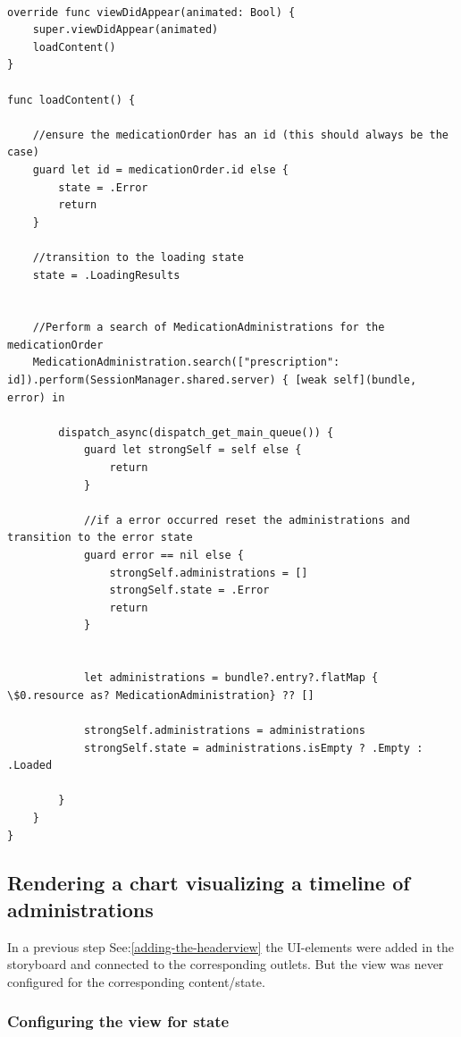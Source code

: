 \documentclass{article}
\begin{document}
\begin{verbatim}

override func viewDidAppear(animated: Bool) {
    super.viewDidAppear(animated)
    loadContent()
}

func loadContent() {

    //ensure the medicationOrder has an id (this should always be the case)
    guard let id = medicationOrder.id else {
        state = .Error
        return
    }

    //transition to the loading state
    state = .LoadingResults


    //Perform a search of MedicationAdministrations for the medicationOrder
    MedicationAdministration.search(["prescription": id]).perform(SessionManager.shared.server) { [weak self](bundle, error) in

        dispatch_async(dispatch_get_main_queue()) {
            guard let strongSelf = self else {
                return
            }

            //if a error occurred reset the administrations and transition to the error state
            guard error == nil else {
                strongSelf.administrations = []
                strongSelf.state = .Error
                return
            }


            let administrations = bundle?.entry?.flatMap { \$0.resource as? MedicationAdministration} ?? []

            strongSelf.administrations = administrations
            strongSelf.state = administrations.isEmpty ? .Empty : .Loaded

        }
    }
}
\end{verbatim}

\subsection{Rendering a chart visualizing a timeline of administrations}\label{step-7.3---implementing-medicationdetailviewcontroller---rendering-a-chart-visualizing-a-timeline-of-administrations}
In a previous step See:\ref{adding-the-headerview} the UI-elements were
added in the storyboard and connected to the corresponding outlets. But
the view was never configured for the corresponding content/state.

\subsubsection{Configuring the view for state}\label{configuring-the-view-for-state}
\end{document}
